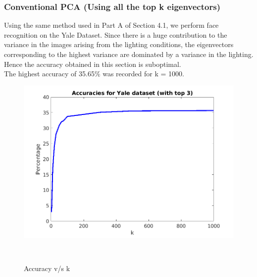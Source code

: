 \documentclass[12pt, a4paper]{article}
\begin{document}
\subsubsection*{Conventional PCA (Using all the top k eigenvectors)}
\quad Using the same method used in Part A of Section 4.1, we perform face recognition on the Yale Dataset. Since there is a huge contribution to the variance in the images arising from the lighting conditions, the eigenvectors corresponding to the highest variance are dominated by a variance in the lighting. Hence the accuracy obtained in this section is suboptimal. \\
The highest accuracy of 35.65\% was recorded for k = 1000.
\begin{figure}[h!]
    \centering
    \renewcommand{\thefigure}{4.1}
    \begin{minipage}[c][1\width]{0.4\textwidth}
    	\hspace*{-0.5in}
    	\includegraphics[width=1.34\textwidth]{yale.png}
    	\null\vspace*{-28pt}
    	\caption{Accuracy v/s k}
	    \label{fig:4.1}
    \end{minipage} \\
\end{figure}
\end{document}
